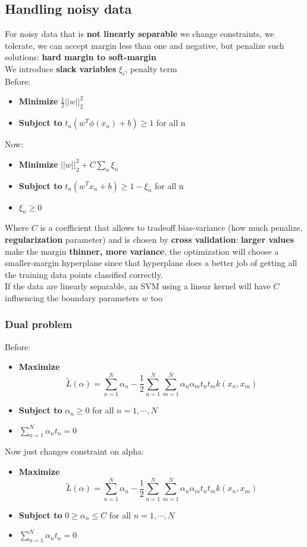 \subsection{Handling noisy data}
    For noisy data that is \textbf{not linearly separable} we change constraints, we tolerate, we can accept margin less than one and negative, but penalize such solutions: \textbf{hard margin to soft-margin}\\
    We introduce \textbf{slack variables} $\xi_i$, penalty term\\
    Before:
    \begin{itemize}
        \item \textbf{Minimize} $\frac{1}{2}||w||^2_2$
        \item \textbf{Subject to} $t_n(w^T\phi(x_n)+b) \geq 1$ for all n
    \end{itemize}
    Now:
    \begin{itemize}
        \item \textbf{Minimize} $||w||^2_2+C\sum_n\xi_n$
        \item \textbf{Subject to} $t_n(w^Tx_n+b) \geq 1-\xi_n$ for all n
        \item $\xi_n \geq 0$
    \end{itemize}
    Where $C$ is a coefficient that allows to tradeoff bias-variance (how much penalize, \textbf{regularization} parameter) and is chosen by \textbf{cross validation}: \textbf{larger values} make the margin \textbf{thinner, more variance}, the optimization will choose a smaller-margin hyperplane since that hyperplane does a better job of getting all the training data points classified correctly.\\
    If the data are linearly separable, an SVM using a linear kernel will have $C$ influencing the boundary parameters $w$ too

    \subsubsection{Dual problem}
    Before:
    \begin{itemize}
        \item \textbf{Maximize} $$\tilde{L}(\alpha)=\sum_{n=1}^N\alpha_n-\frac{1}{2}\sum_{n=1}^N\sum_{m=1}^N\alpha_n\alpha_mt_nt_mk(x_n,x_m)$$
        \item \textbf{Subject to} $\alpha_n \geq 0$ for all $n=1,\cdots,N$
        \item $\sum_{n=1}^N\alpha_nt_n=0$
    \end{itemize}
    Now just changes constraint on alpha:
    \begin{itemize}
        \item \textbf{Maximize} $$\tilde{L}(\alpha)=\sum_{n=1}^N\alpha_n-\frac{1}{2}\sum_{n=1}^N\sum_{m=1}^N\alpha_n\alpha_mt_nt_mk(x_n,x_m)$$
        \item \textbf{Subject to} $0 \geq \alpha_n \leq C$ for all $n=1,\cdots,N$
        \item $\sum_{n=1}^N\alpha_nt_n=0$
    \end{itemize}

